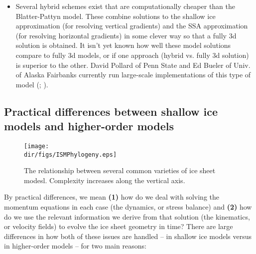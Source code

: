 \begin{itemize}
\item Several hybrid schemes exist that are computationally cheaper than the Blatter-Pattyn model. These combine solutions to the shallow ice approximation (for resolving vertical gradients) and the SSA approximation (for resolving horizontal gradients) in some clever way so that a fully 3d solution is obtained. It isn't yet known how well these model solutions compare to fully 3d models, or if one approach (hybrid vs. fully 3d solution) is superior to the other. David Pollard of Penn State and Ed Bueler of Univ. of Alaska Fairbanks currently run large-scale implementations of this type of model (\citet{Bueler:2009ee}; \citet{Pollard:2009ed}).
\end{itemize}

\subsection{Practical differences between shallow ice models and higher-order models}

\begin{figure}
  \begin{center}
    \texttt{[image: \\dir/figs/ISMPhylogeny.eps]}
   \end{center}
  \caption{The relationship between several common varieties of ice sheet modesl. Complexity increases along the vertical axis.}
   \label{fig:phylogeny}
\end{figure} 

By practical differences, we mean \textbf{(1)} how do we deal with solving the momentum equations in each case (the dynamics, or stress balance) and \textbf{(2)} how do we use the relevant information we derive from that solution (the kinematics, or velocity fields) to evolve the ice sheet geometry in time? There are large differences in how both of these issues are handled -- in shallow ice models versus in higher-order models -- for two main reasons:

